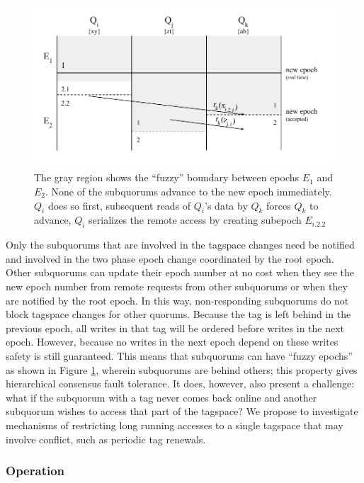 \documentclass{article}
\begin{document}
\begin{figure}
    \centering
        \includegraphics[width=.9\textwidth]{figures/fuzzyepoch}
        \caption[Fuzzy epochs allow reduced coordination between multiple subquorums.]{The gray region shows the ``fuzzy'' boundary between epochs $E_1$ and $E_2$. None of the subquorums advance to the new epoch immediately. $Q_i$ does so first, subsequent reads of $Q_i$'s data by $Q_k$ forces $Q_k$ to advance, $Q_i$ serializes the remote access by creating subepoch $E_{i.2.2}$}
        \label{fig:fuzzyepoch}
\end{figure}

Only the subquorums that are involved in the tagspace changes need be notified and involved in the two phase epoch change coordinated by the root epoch. Other subquorums can update their epoch number at no cost when they see the new epoch number from remote requests from other subquorums or when they are notified by the root epoch. In this way, non-responding subquorums do not block tagspace changes for other quorums. Because the tag is left behind in the previous epoch, all writes in that tag will be ordered before writes in the next epoch. However, because no writes in the next epoch depend on these writes safety is still guaranteed. This means that subquorums can have ``fuzzy epochs'' as shown in Figure \ref{fig:fuzzyepoch}, wherein subquorums are behind others; this property gives hierarchical consensus fault tolerance. It does, however, also present a challenge: what if the subquorum with a tag never comes back online and another subquorum wishes to access that part of the tagspace? We propose to investigate mechanisms of restricting long running accesses to a single tagspace that may involve conflict, such as periodic tag renewals.

\subsubsection{Operation}
\label{sec:hierarchical_operation}
\end{document}

